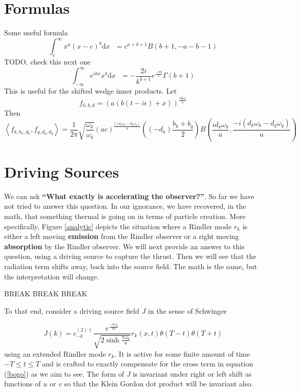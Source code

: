 \documentclass[12pt,a4paper]{article}
\newcommand{\dv}[1]{\mathrm{d} #1 \text{ }}
\begin{document}
\section{Formulas}
Some useful formula
\begin{equation}
  \int_{c}^\infty x^a (x-c)^b \dv{x} = c^{a+b+1} B(b+1, -a-b-1)
\end{equation}
TODO, check this next one
\begin{equation}
  \int_{-\infty}^\infty e^{ikx} x^b \dv{x} = -\frac{2i}{k^{b+1}} e^{\frac{-\pi b}{2}} \Gamma(b+1)
\end{equation}
This is useful for the shifted wedge inner products. Let
\begin{equation}
  f_{k,b,d} = \left(a\left(b(t-i\epsilon)+x\right)\right)^\frac{id\omega_k}{a}
\end{equation}
Then
\begin{equation}
  \left< f_{k,b_k,d_k}, f_{q,d_q,d_q}\right> = \frac{1}{2\pi} \sqrt{\frac{\omega_k}{\omega_q}} (ac)^\frac{i(d_k\omega_k - d_q \omega_q)}{a} \left((-d_k)\frac{b_k + b_q}{2} \right) B\left(\frac{id_k\omega_k}{a}, \frac{-i(d_k\omega_k - d_q \omega_q)}{a}\right)
\end{equation}
\section{Driving Sources}

We can ask {\bf ``What exactly is accelerating the observer?''}.  So far we have not tried to answer this question.  In our ignorance, we have recovered, in the math, that something thermal is going on in terms of particle creation.  More specifically, Figure \ref{analytic} depicts the situation where a Rindler mode $r_k$ is either a left moving {\bf emission} from the Rindler observer or a right moving {\bf absorption} by the Rindler observer.  We will next provide an answer to this question, using a driving source to capture the thrust. Then we will see that the radiation term shifts away, back into the source field.  The math is the same, but the interpretation will change.


BREAK BREAK BREAK


To that end, consider a driving source field $J$ in the sense of Schwinger \cite{schwinger} 

\begin{equation}
  J(k) = c_{-k}^{(2)\dagger} \frac{e^\frac{-\pi \omega_k}{2a}}{\sqrt{2 \sinh \frac{\pi \omega_k}{a}}} r_k(x,t) \theta(T - t) \theta(T+t)
\end{equation}
using an extended Rindler mode $r_k$.  It is active for some finite amount of time $-T \le t \le T$ and is crafted to exactly compensate for the cross term in equation (\ref{bogo}) as we aim to see.  The form of $J$ is invariant under right or left shift as functions of $u$ or $v$ so that the Klein Gordon dot product will be invariant also.
\end{document}
